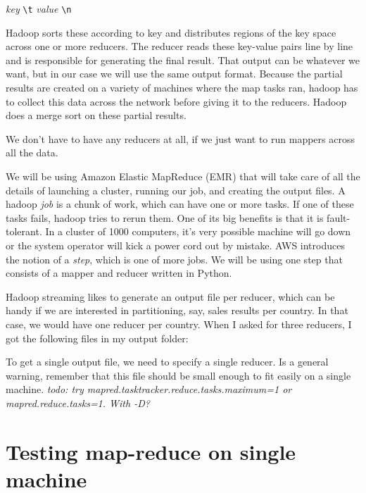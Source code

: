 \begin{fullwidth}
{\em key} \verb+\t+ {\em value} \verb+\n+

Hadoop sorts these according to key and distributes regions of the key space across one or more reducers. The reducer  reads these key-value pairs line by line and is responsible for generating the final result.  That output can be whatever we want, but in our case we will use the same output format. Because the partial results are created on a variety of machines where the map tasks ran, hadoop has to collect this data across the network before giving it to the reducers. Hadoop does a merge sort on these partial results.

We don't have to have any reducers at all, if we just want to run mappers across all the data.

We will be using Amazon Elastic MapReduce (EMR) that will take care of all the details of launching a cluster, running our job, and creating the output files.  A hadoop {\em job} is a chunk of work, which can have one or more tasks. If one of these tasks fails, hadoop tries to rerun them.  One of its big benefits is that it is fault-tolerant. In a cluster of 1000 computers, it's very possible machine will go down or the system operator will kick a power cord out by mistake. AWS introduces the notion of a {\em step}, which is one of more jobs. We will be using one step that consists of a mapper and reducer written in Python.

Hadoop streaming likes to generate an output file per reducer, which can be handy if we are interested in partitioning, say, sales results per country. In that case, we would have one reducer per country.  When I asked for three reducers, I got the following files in my output folder:


To get a single output file, we need to specify a single reducer. Is a general warning, remember that this file should be small enough to fit easily on a single machine. {\em todo: try mapred.tasktracker.reduce.tasks.maximum=1 or mapred.reduce.tasks=1. With -D?}

\section{Testing map-reduce on single machine}


\end{fullwidth}
